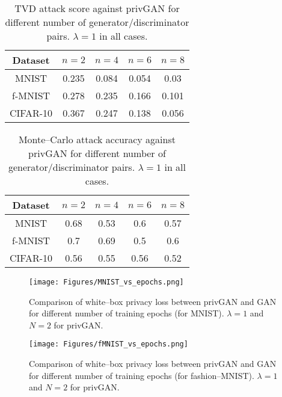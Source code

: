 \documentclass{article}
\begin{document}
\begin{table}[h!]
\small
\begin{center}
\begin{tabular}{ c|c|c|c|c } 
 \hline
 Dataset & $n=2$ & $n=4$ & $n=6$ & $n=8$
 \\ \hline
 MNIST  & 0.235 & 0.084 & 0.054 & 0.03\\ 
 f-MNIST  & 0.278 & 0.235 & 0.166 & 0.101\\
 CIFAR-10 & 0.367 & 0.247 & 0.138 & 0.056\\
 \hline
\end{tabular}
\end{center}
 \caption{TVD attack score against privGAN for different number of generator/discriminator pairs. $\lambda=1$ in all cases.}
 \label{SuppTable5}
\end{table}

\begin{table}[h!]
\small
\begin{center}
\begin{tabular}{ c|c|c|c|c } 
 \hline
 Dataset & $n=2$ & $n=4$ & $n=6$ & $n=8$
 \\ \hline
 MNIST  & 0.68 & 0.53 & 0.6 & 0.57\\ 
 f-MNIST  & 0.7 & 0.69 & 0.5 & 0.6\\
 CIFAR-10 & 0.56 & 0.55 & 0.56 & 0.52\\
 \hline
\end{tabular}
\end{center}
 \caption{Monte--Carlo attack accuracy against privGAN for different number of generator/discriminator pairs. $\lambda=1$ in all cases.}
 \label{SuppTable6}
\end{table}

\begin{figure}[H]
    \centering
    \texttt{[image: Figures/MNIST\_vs\_epochs.png]}
    \caption{Comparison of white--box privacy loss between privGAN and GAN for different number of training epochs (for MNIST). $\lambda=1$  and $N=2$ for privGAN.}
    \label{priv-epochs-mnist}
\end{figure}

\begin{figure}[H]
    \centering
    \texttt{[image: Figures/fMNIST\_vs\_epochs.png]}
    \caption{Comparison of white--box privacy loss between privGAN and GAN for different number of training epochs (for fashion--MNIST).  $\lambda=1$  and $N=2$ for privGAN.}
    \label{priv-epochs-fmnist}
\end{figure}
\end{document}
